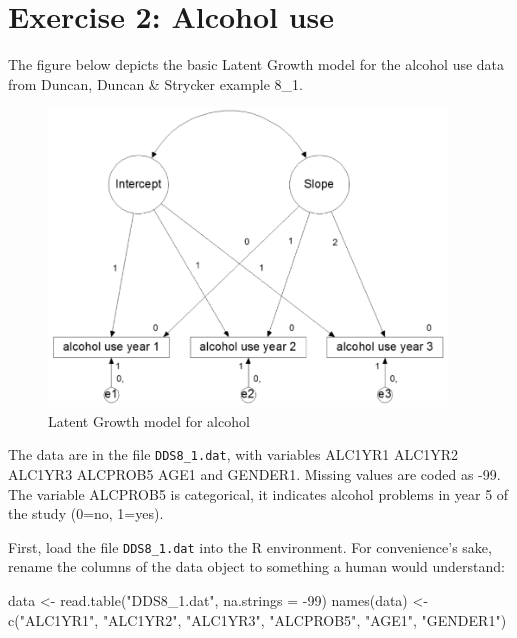 \documentclass[
]{book}
\newenvironment{Shaded}{\begin{snugshade}}{\end{snugshade}}
\newcommand{\AttributeTok}[1]{\textcolor[rgb]{0.77,0.63,0.00}{#1}}
\newcommand{\DecValTok}[1]{\textcolor[rgb]{0.00,0.00,0.81}{#1}}
\newcommand{\FunctionTok}[1]{\textcolor[rgb]{0.00,0.00,0.00}{#1}}
\newcommand{\NormalTok}[1]{#1}
\newcommand{\OtherTok}[1]{\textcolor[rgb]{0.56,0.35,0.01}{#1}}
\newcommand{\SpecialCharTok}[1]{\textcolor[rgb]{0.00,0.00,0.00}{#1}}
\newcommand{\StringTok}[1]{\textcolor[rgb]{0.31,0.60,0.02}{#1}}
\begin{document}
\hypertarget{exercise-2-alcohol-use}{%
\section{Exercise 2: Alcohol use}\label{exercise-2-alcohol-use}}

The figure below depicts the basic Latent Growth model for the alcohol use data from Duncan, Duncan \& Strycker example 8\_1.

\begin{figure}
\centering
\includegraphics[width=4.16667in,height=\textheight]{./Materials/Figure1_lgm_alcohol.png}
\caption{Latent Growth model for alcohol}
\end{figure}

The data are in the file \texttt{DDS8\_1.dat}, with variables ALC1YR1 ALC1YR2 ALC1YR3 ALCPROB5 AGE1 and
GENDER1. Missing values are coded as -99. The variable ALCPROB5 is categorical, it indicates alcohol problems in
year 5 of the study (0=no, 1=yes).

First, load the file \texttt{DDS8\_1.dat} into the R environment. For convenience's sake, rename the columns of the data object to something a human would understand:

\begin{Shaded}
\begin{Highlighting}[]
\NormalTok{data }\OtherTok{\textless{}{-}} \FunctionTok{read.table}\NormalTok{(}\StringTok{"DDS8\_1.dat"}\NormalTok{, }\AttributeTok{na.strings =} \SpecialCharTok{{-}}\DecValTok{99}\NormalTok{)}
\FunctionTok{names}\NormalTok{(data) }\OtherTok{\textless{}{-}} \FunctionTok{c}\NormalTok{(}\StringTok{"ALC1YR1"}\NormalTok{, }\StringTok{"ALC1YR2"}\NormalTok{, }\StringTok{"ALC1YR3"}\NormalTok{,}
                 \StringTok{"ALCPROB5"}\NormalTok{, }\StringTok{"AGE1"}\NormalTok{, }\StringTok{"GENDER1"}\NormalTok{)}
\end{Highlighting}
\end{Shaded}
\end{document}

